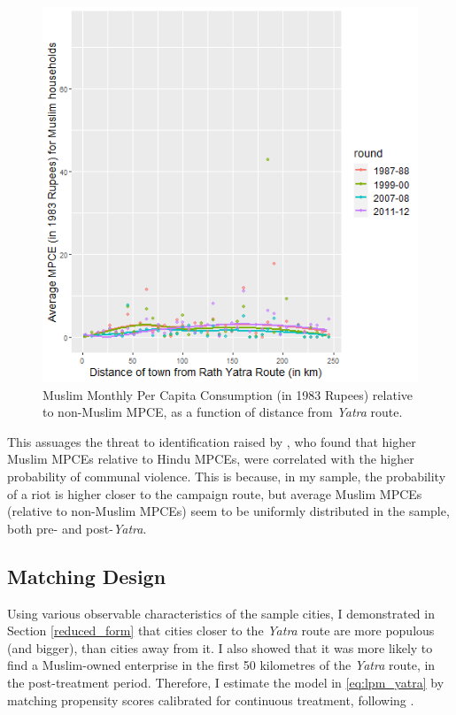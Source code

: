 \documentclass{article}
\begin{document}
 \begin{figure}[H]
     \centering
     \includegraphics[scale = 0.6]{images/graph_mpce_yatra_muslim.png}
     \caption{Muslim Monthly Per Capita Consumption (in 1983 Rupees) relative to non-Muslim MPCE, as a function of distance from \textit{Yatra} route.}
     \label{fig:mpce_yatra_muslim}
 \end{figure}
 
 This assuages the threat to identification raised by \cite{mitra.2014}, who found that higher Muslim MPCEs relative to Hindu MPCEs, were correlated with the higher probability of communal violence. This is because, in my sample, the probability of a riot is higher closer to the campaign route, but average Muslim MPCEs (relative to non-Muslim MPCEs) seem to be uniformly distributed in the sample, both pre- and post-\textit{Yatra}.

\subsection{Matching Design}\label{matching}
Using various observable characteristics of  the sample cities, I demonstrated in Section \ref{reduced_form} that cities closer to the \textit{Yatra} route are more populous (and bigger), than cities away from it. I also showed that it was more likely to find a Muslim-owned enterprise in the first 50 kilometres of the \textit{Yatra} route, in the post-treatment period. Therefore, I estimate the model in \eqref{eq:lpm_yatra} by matching propensity scores calibrated for continuous treatment, following \cite{hirano2004propensity}.
\end{document}
